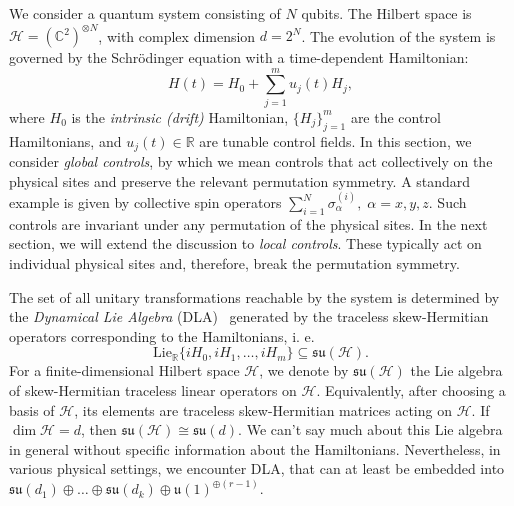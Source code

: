 \documentclass[10pt,twocolumn,superscriptaddress,aps,amsmath,amssymb,citeautoscript,floatfix,prx,longbibliography]{revtex4-2}
\newcounter{alg}
\theoremstyle{plain}
\theoremstyle{plain}
\theoremstyle{plain}
\theoremstyle{plain}
\theoremstyle{plain}
\theoremstyle{plain}
\begin{document}
We consider a quantum system consisting of $N$ qubits. The Hilbert space is $\mathcal{H} = (\mathbb{C}^2)^{\otimes N}$, with complex dimension $d = 2^N$. The evolution of the system is governed by the Schrödinger equation with a time-dependent Hamiltonian:
\begin{equation}\label{eq:system_ham}
    H(t) = H_{0} + \sum_{j=1}^m u_j(t) H_j,
\end{equation}
where $H_{0}$ is the \textit{intrinsic (drift)} Hamiltonian, $\{H_j\}_{j=1}^m$ are the control Hamiltonians, and $u_j(t) \in \mathbb{R}$ are tunable control fields. In this section, we consider \textit{global controls}, by which we mean controls that act collectively on the physical sites and preserve the relevant permutation symmetry. A standard example is given by collective spin operators
$
    \sum_{i=1}^N \sigma_\alpha^{(i)},
   \;
    \alpha=x,y,z.
$
Such controls are invariant under any permutation of the physical sites.
In the next section, we will extend the discussion to \textit{local controls}. These typically act on individual physical sites and, therefore, break the permutation symmetry.

The set of all unitary transformations reachable by the system is determined by the \textit{Dynamical Lie Algebra} (DLA)~\cite{DAlessandro2021, Albertini2003} generated by the traceless skew-Hermitian operators corresponding to the Hamiltonians, i. e.
\begin{equation}
    \mathrm{Lie}_{\mathbb{R}} \{ iH_0, iH_1, \dots, iH_m \} \subseteq \mathfrak{su}(\mathcal{H}).
\end{equation}
For a finite-dimensional Hilbert space \(\mathcal H\), we denote by \(\mathfrak{su}(\mathcal H)\) the Lie algebra of skew-Hermitian traceless linear operators on \(\mathcal H\). Equivalently, after choosing a basis of \(\mathcal H\), its elements are traceless skew-Hermitian matrices acting on \(\mathcal H\). If \(\dim\mathcal H=d\), then
\(
    \mathfrak{su}(\mathcal H)\cong \mathfrak{su}(d).
\)
We can't say much about this Lie algebra in general without specific information about the Hamiltonians. Nevertheless, in various physical settings, we encounter DLA, that can at least be embedded into $\mathfrak{s} \mathfrak{u}\left(d_1\right) \oplus \ldots \oplus \mathfrak{s} \mathfrak{u}\left(d_k\right) \oplus \mathfrak{u}(1)^{\oplus(r-1)}$.
\end{document}
